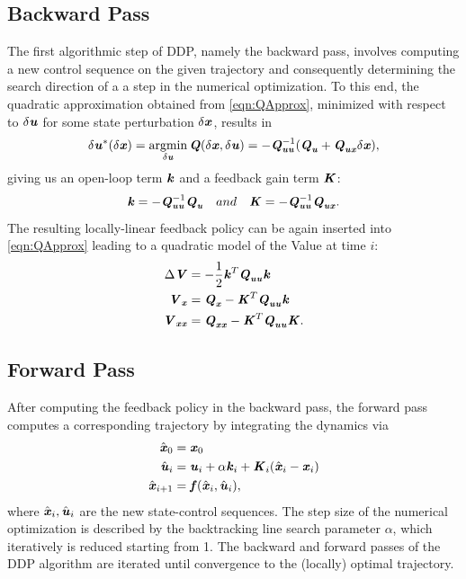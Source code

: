 \subsection{Backward Pass}
The first algorithmic step of \gls{DDP}, namely the backward pass, involves computing a new control sequence on the given trajectory and consequently determining the search direction of a a step in the numerical optimization. To this end, the quadratic approximation obtained from \cref{eqn:QApprox}, minimized with respect to $\delta\bm{\mathit{u}}$ for some state perturbation $\delta\bm{\mathit{x}}$, results in
\begin{equation*}
\delta\bm{\mathit{u}}^*(\delta\bm{\mathit{x}})=\operatorname*{argmin}_{\delta\bm{\mathit{u}}}\bm{\mathit{Q}}(\delta\bm{\mathit{x}},\delta\bm{\mathit{u}})=-\bm{\mathit{Q}}_{\bm{\mathit{u}}\bm{\mathit{u}}}^{-1}(\bm{\mathit{Q}}_{\bm{\mathit{u}}}+\bm{\mathit{Q}}_{\bm{\mathit{u}}\bm{\mathit{x}}}\delta\bm{\mathit{x}}),
\end{equation*}
giving us an open-loop term $\bm{\mathit{k}}$ and a feedback gain term $\bm{\mathit{K}}$:
\begin{equation*}
\bm{\mathit{k}}=-\bm{\mathit{Q}}_{\bm{\mathit{u}}\bm{\mathit{u}}}^{-1}\bm{\mathit{Q}}_{\bm{\mathit{u}}}\quad and \quad \bm{\mathit{K}}=-\bm{\mathit{Q}}_{\bm{\mathit{u}}\bm{\mathit{u}}}^{-1}\bm{\mathit{Q}}_{\bm{\mathit{u}}\bm{\mathit{x}}}.
\end{equation*}
The resulting locally-linear feedback policy can be again inserted into \cref{eqn:QApprox} leading to a quadratic model of the Value at time $i$: 
\begin{align*}
 \Delta \bm{\mathit{V}} &= -\dfrac{1}{2}\bm{\mathit{k}}^T\bm{\mathit{Q}}_{\bm{\mathit{u}}\bm{\mathit{u}}}\bm{\mathit{k}} \\
 \bm{\mathit{V}}_{\bm{\mathit{x}}} &= \bm{\mathit{Q}}_{\bm{\mathit{x}}}-\bm{\mathit{K}}^T\bm{\mathit{Q}}_{\bm{\mathit{u}}\bm{\mathit{u}}}\bm{\mathit{k}} \\
 \bm{\mathit{V}}_{\bm{\mathit{x}}\bm{\mathit{x}}} &= \bm{\mathit{Q}}_{\bm{\mathit{x}}\bm{\mathit{x}}}-\bm{\mathit{K}}^T\bm{\mathit{Q}}_{\bm{\mathit{u}}\bm{\mathit{u}}}\bm{\mathit{\bm{\mathit{K}}}}.
\end{align*}

\subsection{Forward Pass}
After computing the feedback policy in the backward pass, the forward pass computes a corresponding trajectory by integrating the dynamics via
\begin{align*}
\hat{\bm{\mathit{x}}}_0 		&=\bm{\mathit{x}}_0 \\
\hat{\bm{\mathit{u}}}_i 		&=\bm{\mathit{u}}_i+\alpha\bm{\mathit{k}}_i+\bm{\mathit{K}}_i(\hat{\bm{\mathit{x}}}_i-\bm{\mathit{x}}_i) \\
\hat{\bm{\mathit{x}}}_{i+1}	&=\bm{\mathit{f}}(\hat{\bm{\mathit{x}}}_i,\hat{\bm{\mathit{u}}}_i),
\end{align*}
where $\hat{\bm{\mathit{x}}}_i,\hat{\bm{\mathit{u}}}_i$ are the new state-control sequences. The step size of the numerical optimization is described by the backtracking line search parameter $\alpha$, which iteratively is reduced starting from 1. The backward and forward passes of the \gls{DDP} algorithm are iterated until convergence to the (locally) optimal trajectory.  

